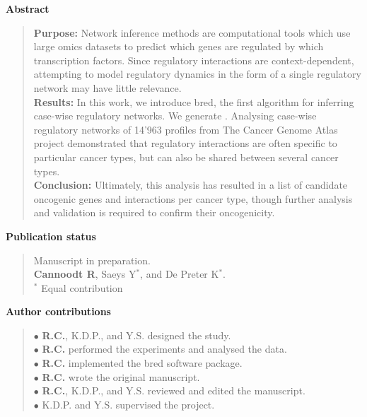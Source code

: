 \documentclass[10pt]{book}
\newif\ifrenderall
\begin{document}
{\large \textbf{Abstract}}
\begin{quote}
	\textbf{Purpose:} Network inference methods are computational tools which use large omics datasets to predict which genes are regulated by which transcription factors.
	Since regulatory interactions are context-dependent, attempting to model regulatory dynamics in the form of a single regulatory network may have little relevance. \\
	\textbf{Results:} In this work, we introduce {bred}, the first algorithm for inferring case-wise regulatory networks. We generate . Analysing case-wise regulatory networks of 14'963 profiles from The Cancer Genome Atlas project demonstrated that regulatory interactions are often specific to particular cancer types, but can also be shared between several cancer types. \\
	\textbf{Conclusion:} Ultimately, this analysis has resulted in a list of candidate oncogenic genes and interactions per cancer type, though further analysis and validation is required to confirm their oncogenicity.
\end{quote}
\vfill
{\large \textbf{Publication status}}
\begin{quote}
	Manuscript in preparation. \\
	\textbf{Cannoodt R}, Saeys Y$^*$, and De Preter K$^*$. \\
	{\footnotesize $^*$ Equal contribution}
\end{quote}

\vfill
{\large \textbf{Author contributions}}
\begin{quote}
	$\bullet$ \textbf{R.C.}, K.D.P., and Y.S. designed the study.\\
	$\bullet$ \textbf{R.C.} performed the experiments and analysed the data.\\
	$\bullet$ \textbf{R.C.} implemented the bred software package.\\
	$\bullet$ \textbf{R.C.} wrote the original manuscript.\\
	$\bullet$ \textbf{R.C.}, K.D.P., and Y.S. reviewed and edited the manuscript. \\
	$\bullet$ K.D.P. and Y.S. supervised the project.
\end{quote}

\vfill

\ifrenderall
\newpage
\graphicspath{{./ch6_bred/}}

\fi 
\newpage{\thispagestyle{empty}\cleardoublepage}
\end{document}
